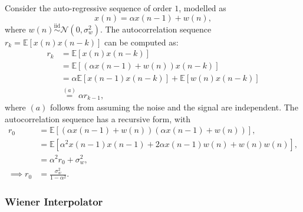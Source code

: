 \documentclass[11pt]{article}
\newcommand{\Ex}{\mathbb{E}}
\begin{document}
Consider the auto-regressive sequence of order $1$, modelled as
\begin{equation}
	x(n) = \alpha x(n-1) + w(n),
\label{eq:signalModel}
\end{equation}
where $w(n) \overset{\text{iid}}{\sim} \mathcal{N}(0, \sigma_{w}^{2})$. The autocorrelation sequence $r_{k} = \Ex[x(n) x(n-k)]$ can be computed as:
\begin{equation}
\begin{split}
	r_{k} &= \Ex[x(n) x(n-k)] \\
	&= \Ex \left[ (\alpha x(n-1) + w(n)) x(n-k) \right] \\
	&= \alpha \Ex \left[ x(n-1) x(n-k) \right] + \Ex \left[ w(n) x(n-k) \right] \\
	& \overset{(a)}{=} \alpha r_{k-1},
\end{split}
\end{equation}
where $(a)$ follows from assuming the noise and the signal are independent. The autocorrelation sequence has a recursive form, with
\begin{equation}
\begin{split}
	r_{0} &= \Ex \left[ (\alpha x(n-1) + w(n)) (\alpha x(n-1) + w(n)) \right], \\
	&= \Ex \left[ \alpha^{2} x(n-1) x(n-1) + 2\alpha x(n-1) w(n) + w(n) w(n) \right], \\
	&= \alpha^{2} r_{0} + \sigma_{w}^{2}, \\
	\implies r_{0} &= \frac{\sigma_{w}^{2}}{1-\alpha^{2}}.
\end{split}
\end{equation}


\subsubsection*{Wiener Interpolator}
\label{subsubsec:wiener}
\end{document}
